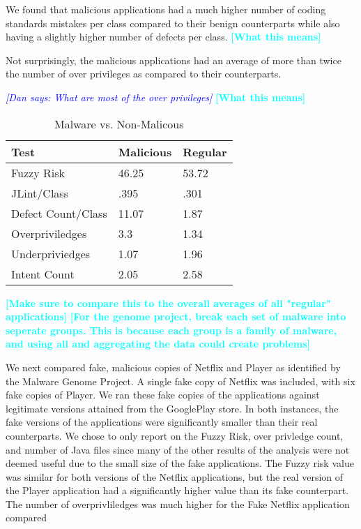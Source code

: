 \documentclass{sig-alternate}
\newcommand{\todo}[1]{\textcolor{cyan}{\textbf{[#1]}}}
\newcommand{\dan}[1]{\textcolor{blue}{{\it [Dan says: #1]}}}
\begin{document}
We found that malicious applications had a much higher number of coding standards mistakes per class compared to their benign counterparts while also having a slightly higher number of defects per class. \todo{What this means}


Not surprisingly, the malicious applications had an average of more than twice the number of over privileges as compared to their counterparts.

\dan{What are most of the over privileges}
\todo{What this means}


\begin{center}

\begin{table}[ht]
\caption{Malware vs. Non-Malicous}
\label{Table:maliciousvsnonmalicious}
  \begin{tabular}{ l | l | l }

     \bfseries Test  & \bfseries Malicious & \bfseries Regular \\ \hline
    Fuzzy Risk & 46.25 & 53.72 \\ \hline
    JLint/Class & .395 & .301 \\ \hline
    Defect Count/Class & 11.07 & 1.87 \\ \hline
    Overpriviledges & 3.3 & 1.34 \\ \hline
    Underpriviedges & 1.07 & 1.96 \\ \hline
    Intent Count & 2.05 & 2.58 \\
  \end{tabular}
\end{table}
\end{center}

\todo{Make sure to compare this to the overall averages of all "regular" applications}
\todo{For the genome project, break each set of malware into seperate groups. This is because each group is a family of malware, and using all and aggregating the data could create problems}




We next compared fake, malicious copies of Netflix and Player as identified by the Malware Genome Project. A single fake copy of Netflix was included, with six fake copies of Player. We ran these fake copies of the applications against legitimate versions attained from the GooglePlay store. In both instances, the fake versions of the applications were significantly smaller than their real counterparts. We chose to only report on the Fuzzy Risk, over privledge count, and number of Java files since many of the other results of the analysis were not deemed useful due to the small size of the fake applications. The Fuzzy risk value was similar for both versions of the Netflix applications, but the real version of the Player application had a significantly higher value than its fake counterpart. The number of overprivliledges was much higher for the Fake Netflix application compared
\end{document}
